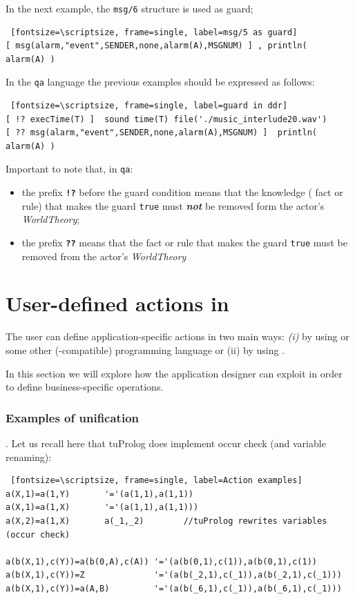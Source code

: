 In the next example, the \texttt{msg/6} structure is used as guard;

\begin{Verbatim} [fontsize=\scriptsize, frame=single, label=msg/5 as guard]		
[ msg(alarm,"event",SENDER,none,alarm(A),MSGNUM) ] , println(  alarm(A) ) 
\end{Verbatim}

In the \texttt{qa} language the previous examples should be expressed as follows:
\begin{Verbatim} [fontsize=\scriptsize, frame=single, label=guard in ddr]	
[ !? execTime(T) ]  sound time(T) file('./music_interlude20.wav')  	
[ ?? msg(alarm,"event",SENDER,none,alarm(A),MSGNUM) ]  println(  alarm(A) ) 
\end{Verbatim}

Important to note that, in \texttt{qa}:

\begin{itemize}
\item  the prefix \texttt{\textbf{!?}} before the guard condition means that the knowledge (\prolog{} fact or rule) that makes the guard \texttt{true} must \textit{\textbf{not}} be removed form the actor's \textit{WorldTheory};
\item the prefix \texttt{\textbf{??}} means that the \prolog{} fact or rule that makes the guard \texttt{true} must be removed from  the actor's \textit{WorldTheory}
\end{itemize}
 

\newpage 
 \section{User-defined actions in \prolog}
 
The user can define application-specific actions in two main ways: \textit{(i)} by using \java{} or some other (\java{}-compatible) programming language or (ii) by using \tuprolog{}.
 
In this section we will explore how the application designer can exploit \tuprolog{} in order to define business-specific operations.

\subsubsection{Examples of unification}.
Let us recall here that tuProlog does implement occur check (and variable renaming):

\begin{Verbatim} [fontsize=\scriptsize, frame=single, label=Action examples]
a(X,1)=a(1,Y)       '='(a(1,1),a(1,1))
a(X,1)=a(1,X)       '='(a(1,1),a(1,1)))
a(X,2)=a(1,X)       a(_1,_2)		//tuProlog rewrites variables (occur check)

a(b(X,1),c(Y))=a(b(0,A),c(A)) '='(a(b(0,1),c(1)),a(b(0,1),c(1))
a(b(X,1),c(Y))=Z              '='(a(b(_2,1),c(_1)),a(b(_2,1),c(_1)))
a(b(X,1),c(Y))=a(A,B)         '='(a(b(_6,1),c(_1)),a(b(_6,1),c(_1)))
\end{Verbatim}

